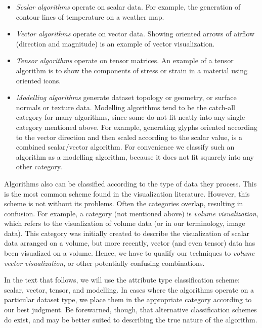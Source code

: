 \begin{itemize}

\item \emph{Scalar algorithms} operate on scalar data. For example, the generation of contour lines of temperature on a weather map.

\item \emph{Vector algorithms} operate on vector data. Showing oriented arrows of airflow (direction and magnitude) is an example of vector visualization.

\item \emph{Tensor algorithms} operate on tensor matrices. An example of a tensor algorithm is to show the components of stress or strain in a material using oriented icons.

\item \emph{Modelling algorithms} generate dataset topology or geometry, or surface normals or texture data. Modelling algorithms tend to be the catch-all category for many algorithms, since some do not fit neatly into any single category mentioned above. For example, generating glyphs oriented according to the vector direction and then scaled according to the scalar value, is a combined scalar/vector algorithm. For convenience we classify such an algorithm as a modelling algorithm, because it does not fit squarely into any other category.

\end{itemize}

Algorithms also can be classified according to the type of data they process. This is the most common scheme found in the visualization literature. However, this scheme is not without its problems. Often the categories overlap, resulting in confusion. For example, a category (not mentioned above) is \emph{volume visualization}, which refers to the visualization of volume data (or in our terminology, image data). This category was initially created to describe the visualization of scalar data arranged on a volume, but more recently, vector (and even tensor) data has been visualized on a volume. Hence, we have to qualify our techniques to \emph{volume vector visualization}, or other potentially confusing combinations.

In the text that follows, we will use the attribute type classification scheme: scalar, vector, tensor, and modelling. In cases where the algorithms operate on a particular dataset type, we place them in the appropriate category according to our best judgment. Be forewarned, though, that alternative classification schemes do exist, and may be better suited to describing the true nature of the algorithm.

